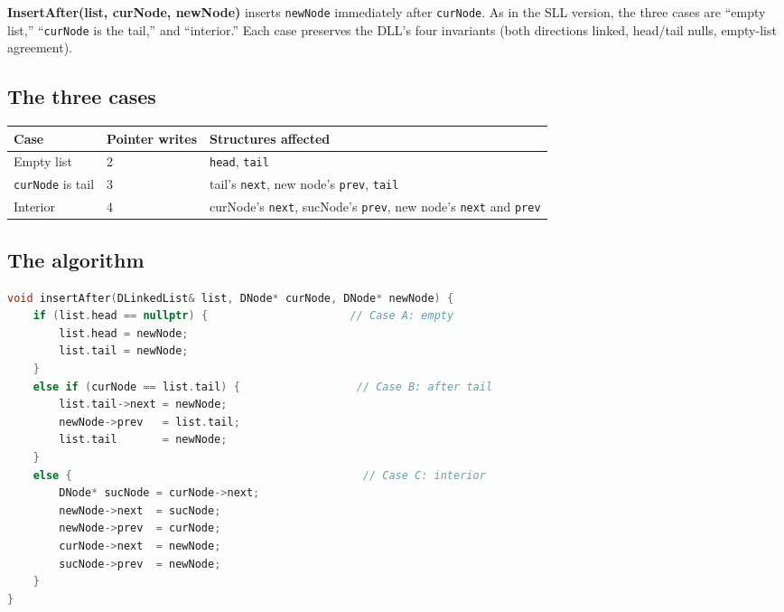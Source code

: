\documentclass[11pt]{article}
\begin{document}
\begin{defnbox}
\textbf{InsertAfter(list, curNode, newNode)} inserts
\texttt{newNode} immediately after \texttt{curNode}. As in the SLL
version, the three cases are ``empty list,'' ``\texttt{curNode} is
the tail,'' and ``interior.'' Each case preserves the DLL's four
invariants (both directions linked, head/tail nulls, empty-list
agreement).
\end{defnbox}

\subsection{The three cases}

\begin{center}
\footnotesize
\renewcommand{\arraystretch}{1.3}
\begin{tabular}{@{}p{3.8cm}p{3cm}p{5cm}@{}}
\hline
\textbf{Case} & \textbf{Pointer writes} & \textbf{Structures affected} \\
\hline
Empty list                      & 2 & \texttt{head}, \texttt{tail} \\
\texttt{curNode} is tail        & 3 & tail's \texttt{next}, new node's \texttt{prev}, \texttt{tail} \\
Interior                        & 4 & curNode's \texttt{next}, sucNode's \texttt{prev}, new node's \texttt{next} and \texttt{prev} \\
\hline
\end{tabular}
\end{center}

\subsection{The algorithm}

\begin{examplebox}
\begin{lstlisting}[basicstyle=\ttfamily\small,frame=single,language=C++]
void insertAfter(DLinkedList& list, DNode* curNode, DNode* newNode) {
    if (list.head == nullptr) {                      // Case A: empty
        list.head = newNode;
        list.tail = newNode;
    }
    else if (curNode == list.tail) {                  // Case B: after tail
        list.tail->next = newNode;
        newNode->prev   = list.tail;
        list.tail       = newNode;
    }
    else {                                             // Case C: interior
        DNode* sucNode = curNode->next;
        newNode->next  = sucNode;
        newNode->prev  = curNode;
        curNode->next  = newNode;
        sucNode->prev  = newNode;
    }
}
\end{lstlisting}
\end{examplebox}
\end{document}

